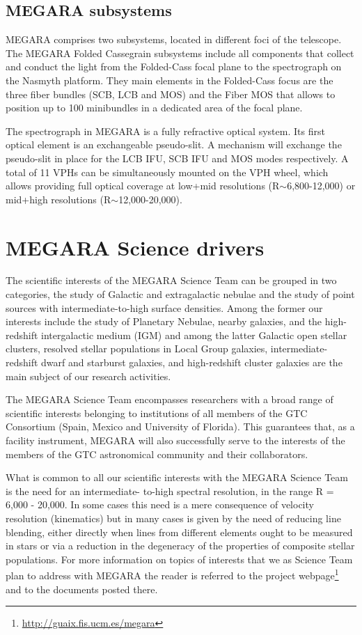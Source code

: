 \documentclass[11pt,twoside]{article}
\begin{document}
\subsection{MEGARA subsystems}
MEGARA comprises two subsystems, located in different foci of the
telescope. The MEGARA Folded Cassegrain subsystems include all components that collect and conduct the light from
the Folded-Cass focal plane to the spectrograph on the Nasmyth platform. 
They main elements in the Folded-Cass focus are the three fiber bundles (SCB, LCB and MOS) and the Fiber MOS that allows to position up to 100 minibundles in a dedicated area of the focal plane.

The spectrograph in MEGARA is a fully refractive optical system. Its first optical element is an exchangeable pseudo-slit. A mechanism will exchange the pseudo-slit in place for the LCB IFU, SCB IFU and MOS modes respectively. A total of 11 VPHs can be simultaneously mounted on the
VPH wheel, which allows providing full optical coverage at low+mid resolutions (R$\sim$6,800-12,000) or mid+high
resolutions (R$\sim$12,000-20,000).

\section{MEGARA Science drivers}
The scientific interests of the MEGARA Science Team
can be grouped in two categories, the study of Galactic and extragalactic nebulae and the study of
point sources with intermediate-to-high surface densities. Among the former our interests include the study of Planetary Nebulae, nearby galaxies, and the high-redshift intergalactic medium
(IGM) and among the latter Galactic open stellar clusters, resolved stellar populations in Local Group galaxies,
intermediate-redshift dwarf and starburst galaxies, and high-redshift cluster galaxies are the main subject of
our research activities. 

The MEGARA Science Team encompasses researchers with a broad range of scientific
interests belonging to institutions of all members of the GTC Consortium (Spain, Mexico and University of
Florida). This guarantees that, as a facility instrument, MEGARA will also successfully serve to the interests of
the members of the GTC astronomical community and their collaborators.

What is common to all our scientific interests with the MEGARA Science Team is the need for an intermediate-
to-high spectral resolution, in the range R = 6,000 - 20,000. In some cases this need is a mere consequence of
velocity resolution (kinematics) but in many cases is given by the need of reducing line blending, either directly
when lines from different elements ought to be measured in stars or via a reduction in the degeneracy of the
properties of composite stellar populations.
For more information on topics of interests that we as Science Team plan to address with MEGARA the reader is referred to the project webpage\footnote{\url{http://guaix.fis.ucm.es/megara}} and to the documents posted there.
\end{document}
